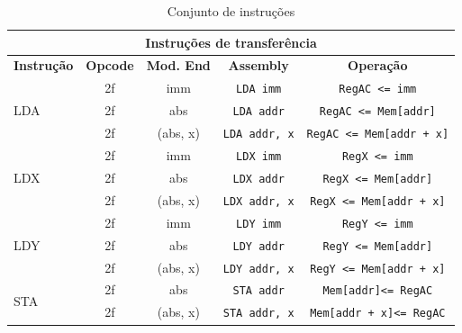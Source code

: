 \documentclass[
	12pt,				  %
	openright,		%
	a4paper,			%
	english,			%
	french,				%
	spanish,			%
	brazil,				%
]{abntex2}
\newcommand{\codenobg}[1]{\texttt{#1}}
\begin{document}
\begin{table}[htb]
	\centering
	\ABNTEXfontereduzida
	\caption{Conjunto de instruções} \label{tab:instSet}
	\begin{tabular}{|l|c|c|c|c|}
		\hline
		\multicolumn{5}{|c|}{\textbf{Instruções de transferência}}                                                                          \\ \hline
		\textbf{Instrução}   & \textbf{Opcode} & \textbf{Mod. End} & \textbf{Assembly}      & \textbf{Operação}                             \\ \hline
		\multirow{3}{*}{LDA} & 2f              & imm               & \codenobg{LDA imm}     & \codenobg{RegAC <= imm}                       \\ \cline{2-5}
		                     & 2f              & abs               & \codenobg{LDA addr}    & \codenobg{RegAC <= Mem[addr]}                 \\ \cline{2-5}
		                     & 2f              & (abs, x)          & \codenobg{LDA addr, x} & \codenobg{RegAC <= Mem[addr + x]}             \\ \hline
		\multirow{3}{*}{LDX} & 2f              & imm               & \codenobg{LDX imm}     & \codenobg{RegX <= imm}                        \\ \cline{2-5}
		                     & 2f              & abs               & \codenobg{LDX addr}    & \codenobg{RegX <= Mem[addr]}                  \\ \cline{2-5}
		                     & 2f              & (abs, x)          & \codenobg{LDX addr, x} & \codenobg{RegX <= Mem[addr + x]}              \\ \hline
		\multirow{3}{*}{LDY} & 2f              & imm               & \codenobg{LDY imm}     & \codenobg{RegY <= imm}                        \\ \cline{2-5}
		                     & 2f              & abs               & \codenobg{LDY addr}    & \codenobg{RegY <= Mem[addr]}                  \\ \cline{2-5}
		                     & 2f              & (abs, x)          & \codenobg{LDY addr, x} & \codenobg{RegY <= Mem[addr + x]}              \\ \hline
		\multirow{2}{*}{STA} & 2f              & abs               & \codenobg{STA addr}    & \codenobg{Mem[addr]<= RegAC}                  \\ \cline{2-5}
		                     & 2f              & (abs, x)          & \codenobg{STA addr, x} & \codenobg{Mem[addr + x]<= RegAC}              \\ \hline

\end{tabular}
\end{table}
\end{document}
